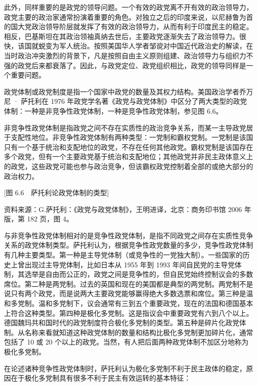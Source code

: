 此外，同样重要的是政党的领导问题。一个有效的政党离不开有效的政治领导力，政党主要的政治家通常扮演着重要的角色。对独立之后的印度来说，以尼赫鲁为首的国大党政治领导阶层就发挥了有效的政治领导力，从而有利于印度民主的稳定。相反，巴基斯坦在其政治领袖真纳去世后，主要政党逐渐失去了政治领导力。很快，该国就蜕变为军人统治。按照美国华人学者邹谠对中国近代政治史的解读，在当时政治冲突激烈的背景下，凡是按照自由主义原则组建、政治领导力与组织力不强的政党后来都衰落了。因此，与政党定位、政党组织相比，政党的领导同样是一个重要问题。


政党体制或政党制度是指一个国家中政党的数量及其权力结构。美国政治学者乔万尼 · 萨托利在 1976 年政党学名著《政党与政党体制》中区分了两大类型的政党体制：一种是非竞争性政党体制，一种是竞争性政党体制，参见图 6.6。

非竞争性政党体制是指政党之间不存在实质性的政治竞争关系，而某一主导政党居于支配性地位。非竞争性政党体制有两种类型：一党制和霸权党制。一党制是该国只有一个基于统治和支配地位的政党，不存在任何其他政党。霸权党制是该国存在多个政党，但有一个主要政党基于统治和支配地位；其他政党并非民主政体意义上的政党，这些政党可能也参与政治竞争，但该霸权政党控制着全部的或绝大部分的政治权力。

[图 6.6　萨托利论政党体制的类型]

资料来源：G.萨托利：《政党与政党体制》，王明进译，北京：商务印书馆 2006 年版，第 182 页，图 4。

与非竞争性政党体制相对的是竞争性政党体制，是指不同政党之间存在实质性竞争关系的政党体制类型。萨托利认为，根据竞争性政党数量的多少，竞争性政党体制有几种主要类型。第一种是主导党体制（或竞争性的一党独大制）。一些国家的历史上曾出现过主导党体制，比如日本从 1955 年到 1993 年间自民党的主导党体制，其选举是自由而公正的，政党之间是竞争性的，但自民党始终控制议会的多数席位。第二种是两党制。过去的英国和现在的美国都是典型的两党制。两党制不是说只有两个政党，而是说两大主要政党能够赢得绝大多数选票和席位。第三种是温和多党制。温和多党制下，议会通常有三到五个重要政党，现在的法国和德国基本上符合这种类型。第四种是极化多党制。这是指议会中重要政党有六到八个以上。德国魏玛共和国时代的政党制度符合极化多党制的类型。第五种是碎片化政党体制。从名称来看就知道这种政党体制的数量和结构比极化多党制更加碎片化，通常包括了 10 或 20 个以上的政党。当然，有人把后面两种政党体制不加区分地称为极化多党制。

在论述诸种竞争性政党体制时，萨托利认为极化多党制不利于民主政体的稳定，原因在于极化多党制具有很多不利于民主有效运转的基本特征：

